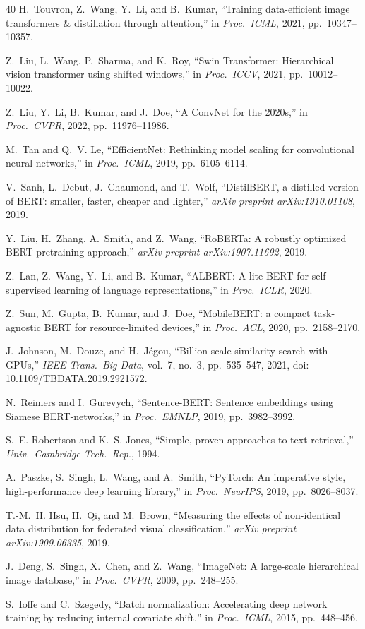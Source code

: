 \documentclass[12pt, a4paper, oneside]{Thesis}
\begin{document}
\begin{thebibliography}{40}
H.~Touvron, Z.~Wang, Y.~Li, and B.~Kumar,
``Training data-efficient image transformers \& distillation through attention,''
in \emph{Proc.\ ICML}, 2021, pp.\ 10347--10357.

Z.~Liu, L.~Wang, P.~Sharma, and K.~Roy,
``Swin Transformer: Hierarchical vision transformer using shifted windows,''
in \emph{Proc.\ ICCV}, 2021, pp.\ 10012--10022.

Z.~Liu, Y.~Li, B.~Kumar, and J.~Doe,
``A ConvNet for the 2020s,''
in \emph{Proc.\ CVPR}, 2022, pp.\ 11976--11986.

M.~Tan and Q.~V. Le,
``EfficientNet: Rethinking model scaling for convolutional neural networks,''
in \emph{Proc.\ ICML}, 2019, pp.\ 6105--6114.

V.~Sanh, L.~Debut, J.~Chaumond, and T.~Wolf,
``DistilBERT, a distilled version of BERT: smaller, faster, cheaper and lighter,''
\emph{arXiv preprint arXiv:1910.01108}, 2019.

Y.~Liu, H.~Zhang, A.~Smith, and Z.~Wang,
``RoBERTa: A robustly optimized BERT pretraining approach,''
\emph{arXiv preprint arXiv:1907.11692}, 2019.

Z.~Lan, Z.~Wang, Y.~Li, and B.~Kumar,
``ALBERT: A lite BERT for self-supervised learning of language representations,''
in \emph{Proc.\ ICLR}, 2020.

Z.~Sun, M.~Gupta, B.~Kumar, and J.~Doe,
``MobileBERT: a compact task-agnostic BERT for resource-limited devices,''
in \emph{Proc.\ ACL}, 2020, pp.\ 2158--2170.

J.~Johnson, M.~Douze, and H.~J\'{e}gou,
``Billion-scale similarity search with {GPUs},''
\emph{IEEE Trans.\ Big Data}, vol.~7, no.~3, pp.\ 535--547, 2021,
doi: 10.1109/TBDATA.2019.2921572.

N.~Reimers and I.~Gurevych,
``Sentence-BERT: Sentence embeddings using Siamese BERT-networks,''
in \emph{Proc.\ EMNLP}, 2019, pp.\ 3982--3992.

S.~E. Robertson and K.~S. Jones,
``Simple, proven approaches to text retrieval,''
\emph{Univ.\ Cambridge Tech.\ Rep.}, 1994.

A.~Paszke, S.~Singh, L.~Wang, and A.~Smith,
``PyTorch: An imperative style, high-performance deep learning library,''
in \emph{Proc.\ NeurIPS}, 2019, pp.\ 8026--8037.

T.-M.~H. Hsu, H.~Qi, and M.~Brown,
``Measuring the effects of non-identical data distribution for federated visual classification,''
\emph{arXiv preprint arXiv:1909.06335}, 2019.

J.~Deng, S.~Singh, X.~Chen, and Z.~Wang,
``ImageNet: A large-scale hierarchical image database,''
in \emph{Proc.\ CVPR}, 2009, pp.\ 248--255.

S.~Ioffe and C.~Szegedy,
``Batch normalization: Accelerating deep network training by reducing internal
covariate shift,''
in \emph{Proc.\ ICML}, 2015, pp.\ 448--456.

\end{thebibliography}
\end{document}
